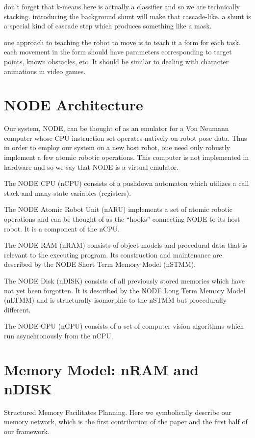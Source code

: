 \documentclass[conference]{IEEEtran}
\begin{document}

don’t forget that k-means here is actually a classifier and so we are technically stacking. 
introducing the background shunt will make that cascade-like. a shunt is a special kind of 
cascade step which produces something like a mask.

one approach to teaching the robot to move is to teach it a form for each task. 
each movement in the form should have parameters corresponding to target points, 
known obstacles, etc.  It should be similar to dealing with character animations in video games. 


\section{NODE Architecture}
Our system, NODE, can be thought of as an emulator for a Von Neumann computer whose CPU 
instruction set operates natively on robot pose data. Thus in order to employ our system 
on a new host robot, one need only robustly implement a few atomic robotic operations. 
This computer is not implemented in hardware and so we say that NODE is a virtual emulator.

The NODE CPU (nCPU) consists of a pushdown automaton which utilizes a call stack and many state variables (registers).

The NODE Atomic Robot Unit (nARU) implements a set of atomic robotic operations and can be 
thought of as the “hooks” connecting NODE to its host robot. It is a component of the nCPU.

The NODE RAM (nRAM) consists of object models and procedural data that is relevant to the 
executing program. Its construction and maintenance are described by the NODE Short Term Memory 
Model (nSTMM).

The NODE Disk (nDISK) consists of all previously stored memories which have not yet been 
forgotten. It is described by the NODE Long Term Memory Model (nLTMM) and is structurally 
isomorphic to the nSTMM but procedurally different.

The NODE GPU (nGPU) consists of a set of computer vision algorithms which run asynchronously 
from the nCPU.


\section{Memory Model: nRAM and nDISK}
Structured Memory Facilitates Planning.
Here we symbolically describe our memory network,
which is the first contribution of the paper and
the first half of our framework.
\end{document}
